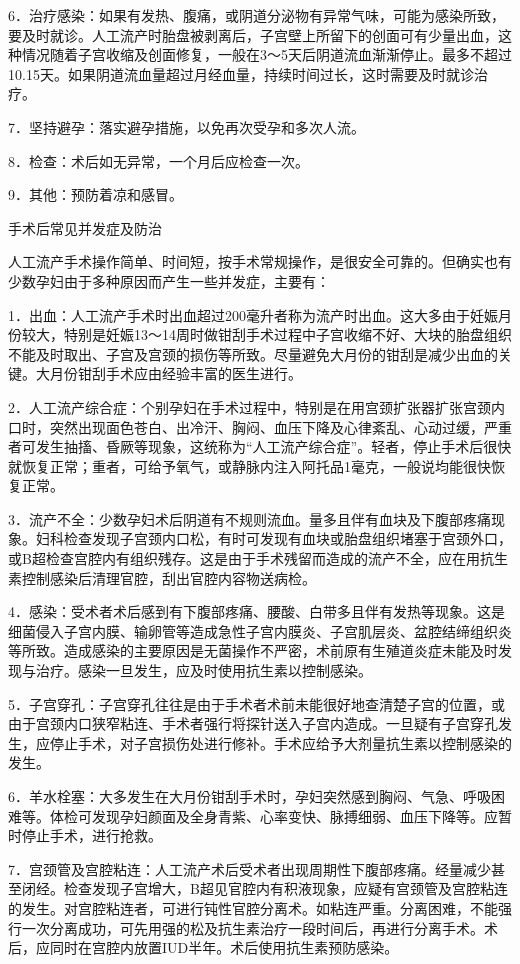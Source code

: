 \documentclass[12pt,UTF8,openany]{ctexbook}
\begin{document}
6．治疗感染：如果有发热、腹痛，或阴道分泌物有异常气味，可能为感染所致，要及时就诊。人工流产时胎盘被剥离后，子宫壁上所留下的创面可有少量出血，这种情况随着子宫收缩及创面修复，一般在3～5天后阴道流血渐渐停止。最多不超过10.15天。如果阴道流血量超过月经血量，持续时间过长，这时需要及时就诊治疗。

7．坚持避孕：落实避孕措施，以免再次受孕和多次人流。

8．检查：术后如无异常，一个月后应检查一次。

9．其他：预防着凉和感冒。





手术后常见并发症及防治


人工流产手术操作简单、时间短，按手术常规操作，是很安全可靠的。但确实也有少数孕妇由于多种原因而产生一些并发症，主要有：

1．出血：人工流产手术时出血超过200毫升者称为流产时出血。这大多由于妊娠月份较大，特别是妊娠13～14周时做钳刮手术过程中子宫收缩不好、大块的胎盘组织不能及时取出、子宫及宫颈的损伤等所致。尽量避免大月份的钳刮是减少出血的关键。大月份钳刮手术应由经验丰富的医生进行。

2．人工流产综合症：个别孕妇在手术过程中，特别是在用宫颈扩张器扩张宫颈内口时，突然出现面色苍白、出冷汗、胸闷、血压下降及心律紊乱、心动过缓，严重者可发生抽搐、昏厥等现象，这统称为“人工流产综合症”。轻者，停止手术后很快就恢复正常；重者，可给予氧气，或静脉内注入阿托品1毫克，一般说均能很快恢复正常。

3．流产不全：少数孕妇术后阴道有不规则流血。量多且伴有血块及下腹部疼痛现象。妇科检查发现子宫颈内口松，有时可发现有血块或胎盘组织堵塞于宫颈外口，或B超检查宫腔内有组织残存。这是由于手术残留而造成的流产不全，应在用抗生素控制感染后清理官腔，刮出官腔内容物送病检。

4．感染：受术者术后感到有下腹部疼痛、腰酸、白带多且伴有发热等现象。这是细菌侵入子宫内膜、输卵管等造成急性子宫内膜炎、子宫肌层炎、盆腔结缔组织炎等所致。造成感染的主要原因是无菌操作不严密，术前原有生殖道炎症未能及时发现与治疗。感染一旦发生，应及时使用抗生素以控制感染。

5．子宫穿孔：子宫穿孔往往是由于手术者术前未能很好地查清楚子宫的位置，或由于宫颈内口狭窄粘连、手术者强行将探针送入子宫内造成。一旦疑有子宫穿孔发生，应停止手术，对子宫损伤处进行修补。手术应给予大剂量抗生素以控制感染的发生。

6．羊水栓塞：大多发生在大月份钳刮手术时，孕妇突然感到胸闷、气急、呼吸困难等。体检可发现孕妇颜面及全身青紫、心率变快、脉搏细弱、血压下降等。应暂时停止手术，进行抢救。

7．宫颈管及宫腔粘连：人工流产术后受术者出现周期性下腹部疼痛。经量减少甚至闭经。检查发现子宫增大，B超见官腔内有积液现象，应疑有宫颈管及宫腔粘连的发生。对宫腔粘连者，可进行钝性官腔分离术。如粘连严重。分离困难，不能强行一次分离成功，可先用强的松及抗生素治疗一段时间后，再进行分离手术。术后，应同时在宫腔内放置IUD半年。术后使用抗生素预防感染。
\end{document}
